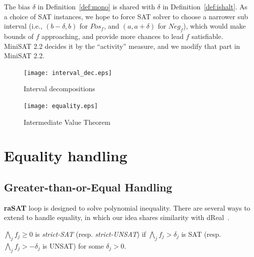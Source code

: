 \documentclass[runningheads,a4paper,oribibl]{llncs}
\begin{document}
The bias $\delta$ in Definition~\ref{def:mono} is shared with $\delta$ in Definition~\ref{def:ishalt}. 
As a choice of SAT instances, we hope to force SAT solver to choose a narrower sub interval 
(i.e., $(b-\delta,b)$ for $Pos_f$, and $(a, a+\delta)$ for $Neg_f$), 
which would make bounds of $f$ approaching, and provide more chances to lead $f$ satisfiable.
MiniSAT 2.2 decides it by the ``activity'' measure, and we modify that part in MiniSAT 2.2. 

\begin{figure}[ht]
\centering
\begin{minipage}[b]{0.45\linewidth}
  \texttt{[image: interval\_dec.eps]}
\caption{Interval decompositions}
\label{fig:decomposition}
\end{minipage}
\quad
\begin{minipage}[b]{0.45\linewidth}
\texttt{[image: equality.eps]}
\caption{Intermediate Value Theorem}
\label{fig:ivt}
\end{minipage}
\end{figure}



\section{Equality handling} \label{sec:equality}

\subsection{Greater-than-or-Equal Handling} \label{sec:geq}

{\bf raSAT} loop is designed to solve polynomial inequality. 
There are several ways to extend to handle equality, in which our idea shares similarity with 
dReal~\cite{dRealCADE13,dRealLICS12}. 

\begin{definition} \label{def:strict_unsat}
$\bigwedge \limits_{j} f_j \geq 0$ is 
{\em strict-SAT} (resp. {\em strict-UNSAT}) 
if $\bigwedge \limits_{j} f_j > \delta_j$ is SAT 
(resp. $\bigwedge \limits_{j} f_j > -\delta_j$ is UNSAT) for some $\delta_j >0$.
\end{definition}
\end{document}
